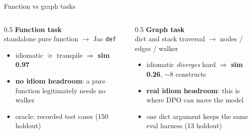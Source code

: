 \documentclass[aspectratio=169,11pt]{beamer}
\begin{document}
\begin{frame}{Function vs graph tasks}
  \begin{columns}[t]
    \begin{column}{0.5\textwidth}
      \centering\textbf{Function task}\\[1mm]
      {\scriptsize standalone pure function $\to$ Jac \texttt{def}}
      \begin{itemize}\scriptsize
        \item idiomatic $\approx$ transpile $\Rightarrow$ \textbf{sim 0.97}
        \item \textbf{no idiom headroom}: a pure function legitimately needs no walker
        \item oracle: recorded test cases (150 holdout)
      \end{itemize}
    \end{column}
    \begin{column}{0.5\textwidth}
      \centering\textbf{Graph task}\\[1mm]
      {\scriptsize dict and stack traversal $\to$ nodes / edges / walker}
      \begin{itemize}\scriptsize
        \item idiomatic \emph{diverges} hard $\Rightarrow$ \textbf{sim 0.26}, $\sim$8 constructs
        \item \textbf{real idiom headroom}: this is where DPO can move the model
        \item one dict argument keeps the same eval harness (13 holdout)
      \end{itemize}
    \end{column}
  \end{columns}

\end{frame}
\end{document}

